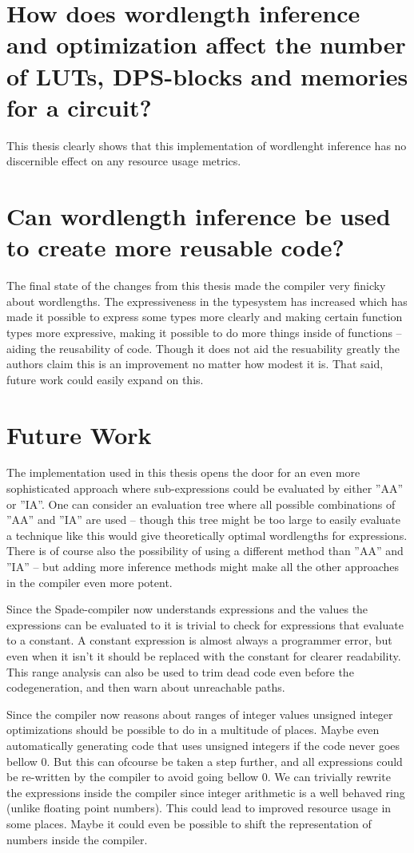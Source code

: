 \documentclass[msc,lith,english]{liuthesis}
\begin{document}
\section{How does wordlength inference and optimization affect the number of LUTs, DPS-blocks and memories for a circuit?}
This thesis clearly shows that this implementation of wordlenght inference has no discernible effect on any resource usage metrics.

\section{Can wordlength inference be used to create more reusable code?}
The final state of the changes from this thesis made the compiler very finicky about wordlengths. The expressiveness in the typesystem has increased which has made it possible to express some types more clearly and making certain function types more expressive, making it possible to do more things inside of functions -- aiding the reusability of code. Though it does not aid the resuability greatly the authors claim this is an improvement no matter how modest it is. That said, future work could easily expand on this.

\section{Future Work}
The implementation used in this thesis opens the door for an even more sophisticated approach where sub-expressions could be evaluated by either ''AA'' or ''IA''. One can consider an evaluation tree where all possible combinations of ''AA'' and ''IA'' are used -- though this tree might be too large to easily evaluate a technique like this would give theoretically optimal wordlengths for expressions. There is of course also the possibility of using a different method than ''AA'' and ''IA'' -- but adding more inference methods might make all the other approaches in the compiler even more potent.

Since the Spade-compiler now understands expressions and the values the expressions can be evaluated to it is trivial to check for expressions that evaluate to a constant. A constant expression is almost always a programmer error, but even when it isn't it should be replaced with the constant for clearer readability. This range analysis can also be used to trim dead code even before the codegeneration, and then warn about unreachable paths.

Since the compiler now reasons about ranges of integer values unsigned integer optimizations should be possible to do in a multitude of places. Maybe even automatically generating code that uses unsigned integers if the code never goes bellow 0. But this can ofcourse be taken a step further, and all expressions could be re-written by the compiler to avoid going bellow 0. We can trivially rewrite the expressions inside the compiler since integer arithmetic is a well behaved ring (unlike floating point numbers). This could lead to improved resource usage in some places. Maybe it could even be possible to shift the representation of numbers inside the compiler.
\end{document}
